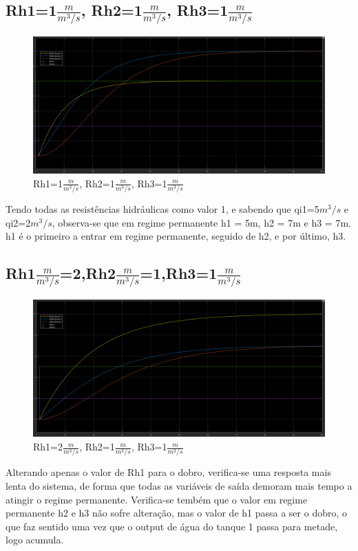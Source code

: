 \documentclass[11pt]{article}
\begin{document}
\subsection{Rh1=1$\frac{m}{m^3/s}$, Rh2=1$\frac{m}{m^3/s}$, Rh3=1$\frac{m}{m^3/s}$}
\begin{figure}[!h]
\includegraphics[width=16cm]{initial.png}
\caption{Rh1=1$\frac{m}{m^3/s}$, Rh2=1$\frac{m}{m^3/s}$, Rh3=1$\frac{m}{m^3/s}$}
\label{fig2.1}
\end{figure}
Tendo todas as resistências hidráulicas como valor 1, e sabendo que qi1=5$m^3/s$ e qi2=2$m^3/s$, observa-se que em regime permanente h1 = 5m, h2 = 7m e h3 = 7m. h1 é o primeiro a entrar em regime permanente, seguido de h2, e  por último, h3.
\pagebreak
\subsection{Rh1$\frac{m}{m^3/s}$=2,Rh2$\frac{m}{m^3/s}$=1,Rh3=1$\frac{m}{m^3/s}$}
\begin{figure}[!h]
\includegraphics[width=16cm]{rh1.png}
\caption{Rh1=2$\frac{m}{m^3/s}$, Rh2=1$\frac{m}{m^3/s}$, Rh3=1$\frac{m}{m^3/s}$}
\label{fig2.2}
\end{figure}
Alterando apenas o valor de Rh1 para o dobro, verifica-se uma resposta mais lenta do sistema, de forma que todas as variáveis de saída demoram mais tempo a atingir o regime permanente. Verifica-se tembém que o valor em regime permanente h2 e h3 não sofre alteração, mas o valor de h1 passa a ser o dobro, o que faz sentido uma vez que o output de água do tanque 1 passa para metade, logo acumula.
\pagebreak
\end{document}
